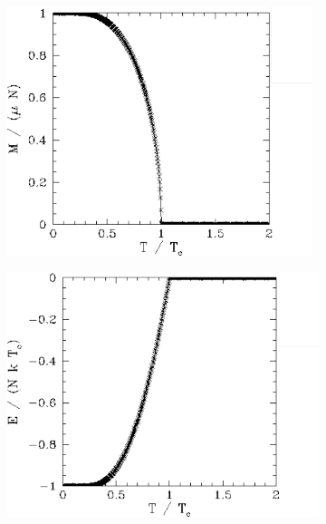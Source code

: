 \documentclass[10 pt, a4paper]{article}
\begin{document}
\begin{figure}[H] 
\begin{subfigure}[b]{0.33\textwidth}
  \centering
    \includegraphics[width=0.98\textwidth]{magTherm}
\end{subfigure}
\begin{subfigure}[b]{0.33\textwidth} 
  \centering
    \includegraphics[width=\textwidth]{eTherm}
\end{subfigure}
\begin{subfigure}[b]{0.33\textwidth} 
  \centering

\end{subfigure}
\end{figure}
\end{document}

